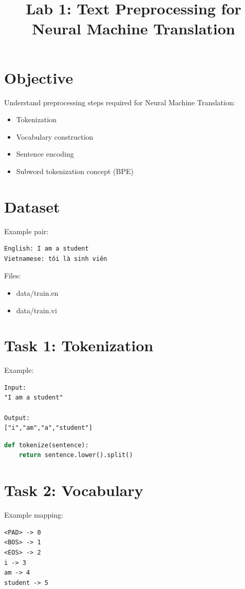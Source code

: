 \documentclass[12pt]{article}
\title{Lab 1: Text Preprocessing for Neural Machine Translation}
\author{}
\date{}
\begin{document}
\maketitle

\section{Objective}
Understand preprocessing steps required for Neural Machine Translation:
\begin{itemize}
\item Tokenization
\item Vocabulary construction
\item Sentence encoding
\item Subword tokenization concept (BPE)
\end{itemize}

\section{Dataset}
Example pair:
\begin{verbatim}
English: I am a student
Vietnamese: tôi là sinh viên
\end{verbatim}

Files:
\begin{itemize}
\item data/train.en
\item data/train.vi
\end{itemize}

\section{Task 1: Tokenization}

Example:
\begin{verbatim}
Input:
"I am a student"

Output:
["i","am","a","student"]
\end{verbatim}

\begin{lstlisting}[language=Python]
def tokenize(sentence):
    return sentence.lower().split()
\end{lstlisting}

\section{Task 2: Vocabulary}

Example mapping:

\begin{verbatim}
<PAD> -> 0
<BOS> -> 1
<EOS> -> 2
i -> 3
am -> 4
student -> 5
\end{verbatim}
\end{document}

